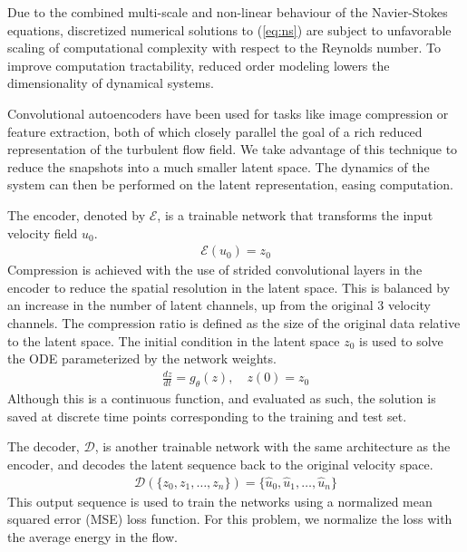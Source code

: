 \documentclass[book.tex]{subfiles}
\begin{document}
Due to the combined multi-scale and non-linear behaviour of the Navier-Stokes equations, discretized numerical solutions to (\ref{eq:ns}) are subject to unfavorable scaling of computational complexity with respect to the Reynolds number.
To improve computation tractability, reduced order modeling lowers the dimensionality of dynamical systems. %

Convolutional autoencoders have been used for tasks like image compression or feature extraction, both of which closely parallel the goal of a rich reduced representation of the turbulent flow field. We take advantage of this technique to reduce the snapshots into a much smaller latent space. The dynamics of the system can then be performed on the latent representation, easing computation. %

The encoder, denoted by $\mathcal{E}$, is a trainable network that transforms the input velocity field $u_0$.
\begin{align}
\mathcal{E}(u_0) = z_0
\end{align}
Compression is achieved with the use of strided convolutional layers in the encoder to reduce the spatial resolution in the latent space. This is balanced by an increase in the number of latent channels, up from the original 3 velocity channels. The compression ratio is defined as the size of the original data relative to the latent space. The initial condition in the latent space $z_0$ is used to solve the ODE parameterized by the network weights.
\begin{align}
\frac{d z}{d t}=g_\theta(z), \quad z(0) = z_0
\end{align}
Although this is a continuous function, and evaluated as such, the solution is saved at discrete time points corresponding to the training and test set.

The decoder, $\mathcal{D}$, is another trainable network with the same architecture as the encoder, and decodes the latent sequence back to the original velocity space.
\begin{align}
\mathcal{D}(\{z_0,z_1,\dotsc,z_n\}) = \{\hat{u}_0,\hat{u}_1,\dotsc,\hat{u}_n\}
\end{align}
This output sequence is used to train the networks using a normalized mean squared error (MSE) loss function. For this problem, we normalize the loss with the average energy in the flow.
\end{document}
